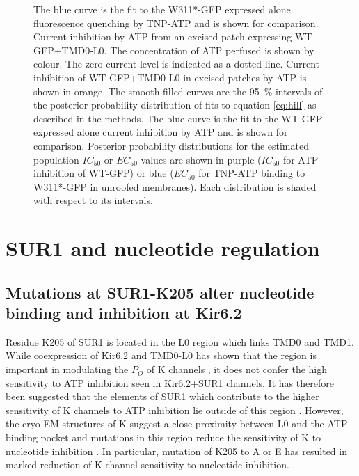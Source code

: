 \begin{figure}[h]
{	The blue curve is the fit to the W311*-GFP expressed alone fluorescence quenching by TNP-ATP and is shown for comparison.
	 Current inhibition by ATP from an excised patch expressing WT-GFP+TMD0-L0.
	The concentration of ATP perfused is shown by colour.
	The zero-current level is indicated as a dotted line.
	 Current inhibition of WT-GFP+TMD0-L0 in excised patches by ATP is shown in orange.
	The smooth filled curves are the \SI{95}{\percent} intervals of the posterior probability distribution of fits to equation \ref{eq:hill} as described in the methods.
	The blue curve is the fit to the WT-GFP expressed alone current inhibition by ATP and is shown for comparison.
	 Posterior probability distributions for the estimated population $IC_{50}$ or $EC_{50}$ values are shown in purple ($IC_{50}$ for ATP inhibition of WT-GFP) or blue ($EC_{50}$ for TNP-ATP binding to W311*-GFP in unroofed membranes).
	Each distribution is shaded with respect to its intervals.
	}\label{ch6fig:tmd0_binding}
\end{figure}

\section{SUR1 and nucleotide regulation}

\subsection{Mutations at SUR1-K205 alter nucleotide binding and inhibition at Kir6.2}

Residue K205 of SUR1 is located in the L0 region which links TMD0 and TMD1.
While coexpression of Kir6.2 and TMD0-L0 has shown that the region is important in modulating the $P_O$ of K\ATP{} channels \cite{babenko_sur_2003, chan_n-terminal_2003-1, pratt_n-terminal_2011}, it does not confer the high sensitivity to ATP inhibition seen in Kir6.2+SUR1 channels.
It has therefore been suggested that the elements of SUR1 which contribute to the higher sensitivity of K\ATP{} channels to ATP inhibition lie outside of this region \cite{babenko_sur_2003, pratt_engineered_2012-1}.
However, the cryo-EM structures of K\ATP{} suggest a close proximity between L0 and the ATP binding pocket \cite{martin_anti-diabetic_2017-1, lee_molecular_2017-1, li_structure_2017} and mutations in this region reduce the sensitivity of K\ATP{} to nucleotide inhibition \cite{ding_structural_2019,pratt_engineered_2012-1, masia_mutation_2007}.
In particular, mutation of K205 to A \cite{ding_structural_2019} or E \cite{pratt_engineered_2012} has resulted in marked reduction of K\ATP{} channel sensitivity to nucleotide inhibition.

